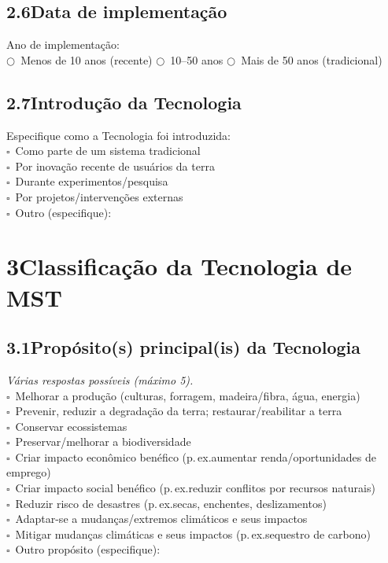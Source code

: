 \subsection{2.6\quad Data de implementação}

Ano de implementação: \dotfill\\
$\bigcirc$~Menos de 10 anos (recente) \quad $\bigcirc$~10--50 anos \quad $\bigcirc$~Mais de 50 anos (tradicional)

\subsection{2.7\quad Introdução da Tecnologia}

Especifique como a Tecnologia foi introduzida:\\
$\square$~Como parte de um sistema tradicional\\
$\square$~Por inovação recente de usuários da terra\\
$\square$~Durante experimentos/pesquisa\\
$\square$~Por projetos/intervenções externas\\
$\square$~Outro (especifique): \dotfill

\section{3\quad Classificação da Tecnologia de MST}

\subsection{3.1\quad Propósito(s) principal(is) da Tecnologia}
\textit{Várias respostas possíveis (máximo 5).}\\[4pt]
$\square$~Melhorar a produção (culturas, forragem, madeira/fibra, água, energia)\\
$\square$~Prevenir, reduzir a degradação da terra; restaurar/reabilitar a terra\\
$\square$~Conservar ecossistemas\\
$\square$~Preservar/melhorar a biodiversidade\\
$\square$~Criar impacto econômico benéfico (p.\,ex.\@ aumentar renda/oportunidades de emprego)\\
$\square$~Criar impacto social benéfico (p.\,ex.\@ reduzir conflitos por recursos naturais)\\
$\square$~Reduzir risco de desastres (p.\,ex.\@ secas, enchentes, deslizamentos)\\
$\square$~Adaptar-se a mudanças/extremos climáticos e seus impactos\\
$\square$~Mitigar mudanças climáticas e seus impactos (p.\,ex.\@ sequestro de carbono)\\
$\square$~Outro propósito (especifique): \dotfill

